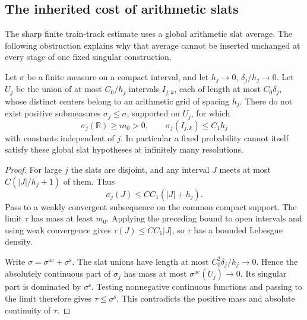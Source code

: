 \subsection{The inherited cost of arithmetic slats}
\label{geomtransfer:slats}

The sharp finite train-track estimate uses a global arithmetic slat
average. The following obstruction explains why that average cannot be
inserted unchanged at every stage of one fixed singular construction.

\begin{proposition}
\label{geomtransfer:slatrigidity}
Let \(\sigma\) be a finite measure on a compact interval, and let
\(h_j\to0\), \(\delta_j/h_j\to0\). Let \(U_j\) be the union of
at most \(C_0/h_j\) intervals \(I_{j,k}\), each of length at most
\(C_0\delta_j\), whose distinct centers belong to an arithmetic grid of
spacing \(h_j\). There do not exist positive submeasures
\(\sigma_j\le\sigma\), supported on \(U_j\), for which
\[
 \sigma_j(\mathbb R)\ge m_0>0,
 \qquad \sigma_j(I_{j,k})\le C_1h_j
\]
with constants independent of \(j\).
In particular a fixed probability cannot itself satisfy these global
slat hypotheses at infinitely many resolutions.
\end{proposition}

\begin{proof}
For large \(j\) the slats are disjoint, and any interval \(J\)
meets at most \(C(|J|/h_j+1)\) of them. Thus
\[
 \sigma_j(J)\le CC_1(|J|+h_j).
\]
Pass to a weakly convergent subsequence on the common compact support.
The limit \(\tau\) has mass at least \(m_0\). Applying the preceding
bound to open intervals and using weak convergence gives
\(\tau(J)\le CC_1|J|\), so \(\tau\) has a bounded Lebesgue density.

Write \(\sigma=\sigma^{\mathrm{ac}}+\sigma^{\mathrm{s}}\).
The slat unions have length at most
\(C_0^2\delta_j/h_j\to0\). Hence the absolutely continuous part
of \(\sigma_j\) has mass at most
\(\sigma^{\mathrm{ac}}(U_j)\to0\). Its singular part is dominated
by \(\sigma^{\mathrm{s}}\). Testing nonnegative continuous functions
and passing to the limit therefore gives \(\tau\le\sigma^{\mathrm{s}}\).
This contradicts the positive mass and absolute continuity of \(\tau\).
\end{proof}

